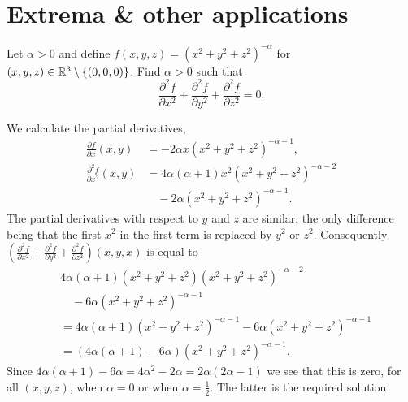 \section{Extrema \& other applications}

\begin{task}
    Let \(\alpha>0\) and define \(f(x,y,z) = {(x^2 + y^2 + z^2)}^{-\alpha}\) for \((x,y,z)\in \mathbb{R}^3 \setminus \{(0,0,0)\}\).
    Find \(\alpha>0\) such that
    \[
        \frac{\partial^2 f}{\partial x^2} + \frac{\partial^2 f}{\partial y^2}  +\frac{\partial^2 f}{\partial z^2}  =0.
    \]
\end{task}

\begin{solution}
    We calculate the partial derivatives,
    \[
        \begin{aligned}
            \tfrac{\partial f}{\partial x}(x,y)
             & = -2 \alpha x{(x^2 + y^2 + z^2)}^{-\alpha-1},           \\
            \tfrac{\partial^2 f}{\partial x^2}(x,y)
             & = 4 \alpha(\alpha+1) x^2{(x^2 + y^2 + z^2)}^{-\alpha-2} \\
             & \quad -2 \alpha {(x^2 + y^2 + z^2)}^{-\alpha-1}.
        \end{aligned}
    \]
    The partial derivatives with respect to \(y\) and \(z\) are similar, the only difference being that the first \(x^2\) in the first term is replaced by \(y^2\) or \(z^2\).
    Consequently \(\left(\tfrac{\partial^2 f}{\partial x^2} + \tfrac{\partial^2 f}{\partial y^2}  +\tfrac{\partial^2 f}{\partial z^2}\right)(x,y,x)\) is equal to
    \[
        \begin{aligned}
             & 4 \alpha(\alpha+1)( x^2 + y^2 + z^2){(x^2 + y^2 + z^2)}^{-\alpha-2} \\
             & \quad -6 \alpha {(x^2 + y^2 + z^2)}^{-\alpha-1}                     \\
             & =  4 \alpha(\alpha+1){(x^2 + y^2 + z^2)}^{-\alpha-1}                %
            -6 \alpha {(x^2 + y^2 + z^2)}^{-\alpha-1}                              \\
             & = (4 \alpha(\alpha+1) -6 \alpha ) {(x^2 + y^2 + z^2)}^{-\alpha-1}.
        \end{aligned}
    \]
    Since \(4 \alpha(\alpha+1) - 6 \alpha = 4\alpha^2 - 2\alpha = 2\alpha(2\alpha -1)\) we see that this is zero, for all \((x,y,z)\), when \(\alpha=0\) or when \(\alpha = \frac{1}{2}\).
    The latter is the required solution.
\end{solution}


